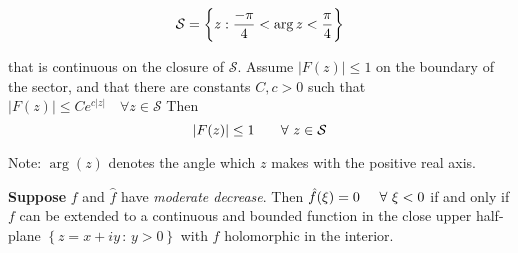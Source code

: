 \documentclass[11pt]{article}
\begin{document}
\[\Large\mathcal{S}=\left\{z:\frac{-\pi}{4}<\arg z < \frac{\pi}{4}\right\}\]

that is continuous on the closure of \(\mathcal{S}\). Assume
\(|F(z)|\le 1\) on the boundary of the sector, and that there are
constants \(C,c>0\) such that
\(|F(z)|\le Ce^{c|z|}\quad \forall z\in\mathcal{S}\) Then
\[\huge|F(z)|\le 1 \quad \forall\,\,z\in\mathcal{S}\]

Note: \(\arg(z)\) denotes the angle which \(z\) makes with the positive
real axis.

\textbf{Suppose} \(f\) and \(\hat{f}\) have \emph{moderate decrease}.
Then \(\Large\hat{f}(\xi)=0\quad\forall\,\,\xi<0\) if and only if \(f\)
can be extended to a continuous and bounded function in the close upper
half-plane \(\left\{z=x+iy\,:\,y>0\right\}\) with \(f\) holomorphic in
the interior.
\end{document}
